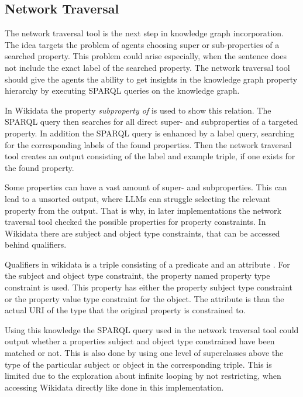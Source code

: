 \documentclass[a4paper,oneside,bibliography=totoc]{scrbook}
\begin{document}
\subsection{Network Traversal}
\label{subsec:network_traversal}

The network traversal tool is the next step in knowledge graph incorporation. The idea targets the problem of agents choosing super or sub-properties of a searched property. This problem could arise especially, when the sentence does not include the exact label of the searched property. The network traversal tool should give the agents the ability to get insights in the knowledge graph property hierarchy by executing SPARQL queries on the knowledge graph.

In Wikidata the property \textit{subproperty of} is used to show this relation. The SPARQL query then searches for all direct super- and subproperties of a targeted property. In addition the SPARQL query is enhanced by a label query, searching for the corresponding labels of the found properties. Then the network traversal tool creates an output consisting of the label and example triple, if one exists for the found property.

Some properties can have a vast amount of super- and subproperties. This can lead to a unsorted output, where \acp{LLM} can struggle selecting the relevant property from the output. That is why, in later implementations the network traversal tool checked the possible properties for property constraints. In Wikidata there are subject and object type constraints, that can be accessed behind qualifiers.

Qualifiers in wikidata is a triple consisting of a predicate and an attribute \cite{Wikidata2025}. For the subject and object type constraint, the property named property type constraint is used. This property has either the property subject type constraint or the property value type constraint for the object. The attribute is than the actual URI of the type that the original property is constrained to.

Using this knowledge the SPARQL query used in the network traversal tool could output whether a properties subject and object type constrained have been matched or not. This is also done by using one level of superclasses above the type of the particular subject or object in the corresponding triple. This is limited due to the exploration about infinite looping by not restricting, when accessing Wikidata directly like done in this implementation.
\end{document}
